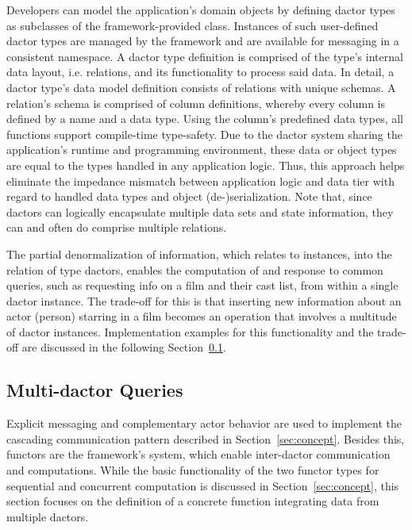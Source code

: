 Developers can model the application's domain objects by defining \gls{dactor} types as subclasses of the framework-provided  class.
Instances of such user-defined \gls{dactor} types are managed by the framework and are available for messaging in a consistent namespace.
A \gls{dactor} type definition is comprised of the type's internal data layout, i.e. \glspl{relation}, and its functionality to process said data.
In detail, a \gls{dactor} type's data model definition consists of \glspl{relation} with unique schemas.
A \gls{relation}'s schema is comprised of column definitions, whereby every column is defined by a name and a data type.
Using the column's predefined data types, all functions support compile-time type-safety.
Due to the \gls{dactor} system sharing the application's runtime and programming environment, these data or object types are equal to the types handled in any application logic.
Thus, this approach helps eliminate the impedance mismatch between application logic and data tier with regard to handled data types and object (de-)serialization.
Note that, since \glspl{dactor} can logically encapsulate multiple data sets and state information, they can and often do comprise multiple \glspl{relation}.

The partial denormalization of information, which relates to  instances, into the  \gls{relation} of  type \glspl{dactor},
enables the computation of and response to common queries, such as requesting info on a film and their cast list, from within a single \gls{dactor} instance.
The trade-off for this is that inserting new information about an actor (person) starring in a film becomes an operation that involves a multitude of \gls{dactor} instances.
Implementation examples for this functionality and the trade-off are discussed in the following Section~\ref{subsec:multi_dactor_queries}.

\subsection[Multi-Dactor Queries]{Multi-\Gls{dactor} Queries}\label{subsec:multi_dactor_queries}

Explicit messaging and complementary actor behavior are used to implement the cascading communication pattern described in Section~\ref{sec:concept}.
Besides this, \glspl{functor} are the framework's system, which enable inter-\gls{dactor} communication and computations.
While the basic functionality of the two \gls{functor} types for sequential and concurrent computation is discussed in Section~\ref{sec:concept}, this section focuses on the definition of a concrete function integrating data from multiple \glspl{dactor}.

